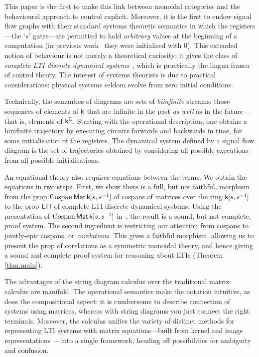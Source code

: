 This paper is the first to make this link between monoidal categories and the
behavioural approach to control explicit. Moreover, it is the first to endow
signal flow graphs with their standard systems theoretic semantics in which the
registers---the `$s$' gates---are permitted to hold \emph{arbitrary} values at
the beginning of a computation (in previous work~\cite{BSZ1,BSZ3} they were
initialised with $0$).  This extended notion of behaviour is not merely a
theoretical curiosity: it gives the class of \emph{complete LTI discrete
dynamical systems}~\cite{Wi3}, which is practically the lingua franca of control
theory. The interest of systems theorists is due to practical considerations:
physical systems seldom evolve from zero initial conditions.

Technically, the semantics of diagrams are sets of \emph{biinfinite}
streams: those sequences of elements of $\mathsf{k}$ that are infinite in the past
\emph{as well} as in the future---that is, elements of $\mathsf{k}^{\mathbb Z}$.  Starting with
the operational description, one obtains a biinfinite trajectory by executing
circuits forwards and backwards in time, for some initialisation of the
registers. The dynamical system defined by a signal flow diagram is the set of
trajectories obtained by considering all possible executions from all possible initialisations.

An equational theory also requires equations between the terms. We obtain the
equations in two steps. First, we show there is a full, but not faithful,
morphism from the prop $\operatorname{{Cospan}}\operatorname{\mathsf{Mat}}{\mathsf{k}[s,s^{-1}]}$ of cospans of matrices over the ring
${\mathsf{k}[s,s^{-1}]}$ to the prop $\operatorname{\mathsf{LTI}}$ of complete LTI discrete dynamical systems.
Using the presentation of $\operatorname{{Cospan}}\operatorname{\mathsf{Mat}}{\mathsf{k}[s,s^{-1}]}$ in~\cite{BSZ2,Za}, the result is a
sound, but not complete, proof system. The second ingredient is restricting our
attention from cospans to jointly-epic cospans, or \emph{corelations}. This
gives a faithful morphism, allowing us to present the prop of corelations as a
symmetric monoidal theory, and hence giving a sound and complete proof system for
reasoning about LTIs (Theorem \ref{thm.main}).

The advantages of the string diagram calculus over the traditional matrix
calculus are manifold. The operational semantics make the notation intuitive, as
does the compositional aspect: it is cumbersome to describe connection of
systems using matrices, whereas with string diagrams you just connect the right
terminals. Moreover, the calculus unifies the variety of distinct methods for representing
LTI systems with matrix equations---built from kernel and image
representations~\cite{Wi,Wi3}---into a single framework, heading off
possibilities for ambiguity and confusion.

